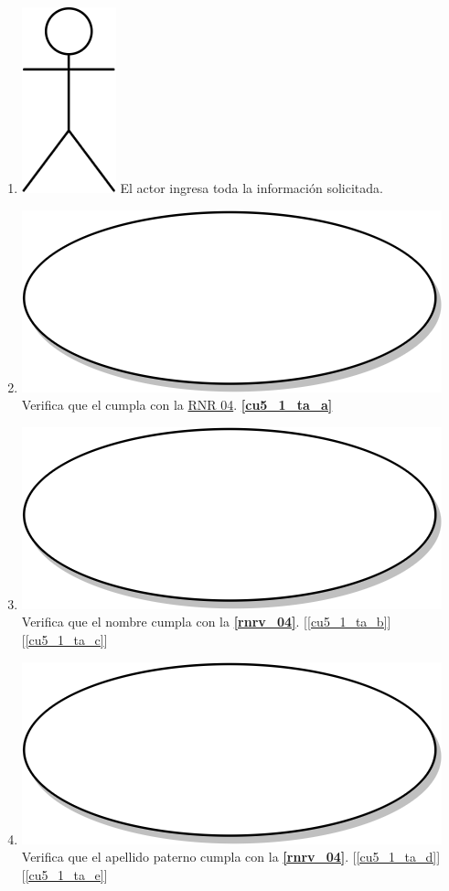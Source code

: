 \begin{enumerate}
\item {\includegraphics[scale=.1]{Capitulo3/img/actor.png} El actor ingresa toda la información solicitada.}
  \item {\includegraphics[scale=.05]{Capitulo3/img/proceso.png} Verifica que el cumpla con la \hyperref[rnr_04]{RNR 04}. \textbf{\ref{cu5_1_ta_a}}}
 \item {\includegraphics[scale=.05]{Capitulo3/img/proceso.png} Verifica que el nombre cumpla con la \textbf{\ref{rnrv_04}}. [\ref{cu5_1_ta_b}] [\ref{cu5_1_ta_c}]}
  \item {\includegraphics[scale=.05]{Capitulo3/img/proceso.png} Verifica que el apellido paterno cumpla con la \textbf{\ref{rnrv_04}}. [\ref{cu5_1_ta_d}] [\ref{cu5_1_ta_e}]}

\end{enumerate}
